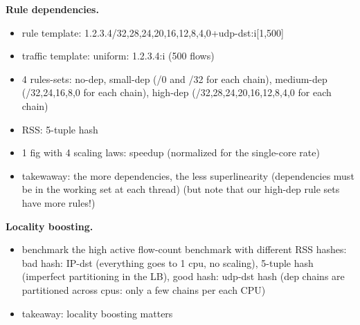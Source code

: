 \noindent%
\textbf{Rule dependencies.} %
\begin{itemize}
\item rule template: 1.2.3.4/{32,28,24,20,16,12,8,4,0}+udp-dst:i[1,500]
\item traffic template: uniform: 1.2.3.4:i (500 flows) 
\item 4 rules-sets: no-dep, small-dep (/0 and /32 for each chain), medium-dep (/{32,24,16,8,0} for each chain), high-dep (/{32,28,24,20,16,12,8,4,0} for each chain)
\item RSS: 5-tuple hash
\item 1 fig with 4 scaling laws: speedup (normalized for the single-core rate)
\item takewaway: the more dependencies, the less superlinearity (dependencies must be in the working set at each thread) (but note that our high-dep rule sets have more rules!)
\end{itemize}

\noindent%
\textbf{Locality boosting.} %
\begin{itemize}
\item benchmark the high active flow-count benchmark with different RSS hashes: bad hash: IP-dst (everything goes to 1 cpu, no scaling), 5-tuple hash (imperfect partitioning in the LB), good hash: udp-dst hash (dep chains are partitioned across cpus: only a few chains per each CPU) 
\item takeaway: locality boosting matters
\end{itemize}


